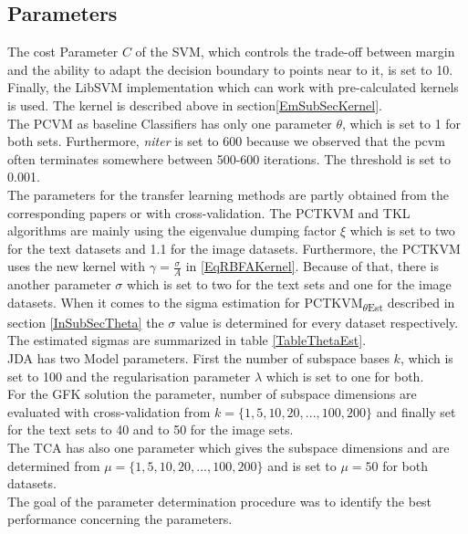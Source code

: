\subsection{Parameters}
The cost Parameter $C$ of the \acs{SVM}, which controls the trade-off between margin and the ability to adapt the decision boundary to points near to it, is set to 10. \cite[p. 421-422]{TrevorHastie.2009}
Finally, the LibSVM implementation which can work with pre-calculated kernels is used. The kernel is described above in section\ref{EmSubSecKernel}.\\
The PCVM as baseline Classifiers has only one parameter $\theta$, which is set to 1 for both sets.
Furthermore, \textit{niter} is set to 600 because we observed that the \acs{pcvm} often terminates somewhere between 500-600 iterations. The threshold is set to 0.001.\\
The parameters for the transfer learning methods are partly obtained from the corresponding papers or with cross-validation. 
The \acs{PCTKVM} and \acs{TKL} algorithms are mainly using the eigenvalue dumping factor $\xi$ which is set to two for the text datasets and 1.1 for the image datasets.\cite{Long.2015}
Furthermore, the \acs{PCTKVM} uses the new kernel with $\gamma=\frac{\sigma}{A}$ in \eqref{EqRBFAKernel}.
Because of that, there is another parameter $\sigma$ which is set to two for the text sets and one for the image datasets.
When it comes to the sigma estimation for \acs{PCTKVM}\textsubscript{$\theta$Est} described in section \ref{InSubSecTheta} the $\sigma$ value is determined for every dataset respectively.
The estimated sigmas are summarized in table \ref{TableThetaEst}. \\
\acs{JDA} has two Model parameters.
First the number of subspace bases $k$, which is set to 100 and the regularisation parameter $\lambda $ which is set to one for both.\cite{Long.}\\
For the \acs{GFK} solution the parameter, number of subspace dimensions are evaluated with cross-validation from $k=\{1,5,10,20,...,100,200\}$ and finally set for the text sets to 40 and to 50 for the image sets.\\
The \acs{TCA} has also one parameter which gives the subspace dimensions and are determined from $\mu=\{1,5,10,20,...,100,200\}$ and is set to $\mu=50$ for both datasets.\\
The goal of the parameter determination procedure was to identify the best performance concerning the parameters.
